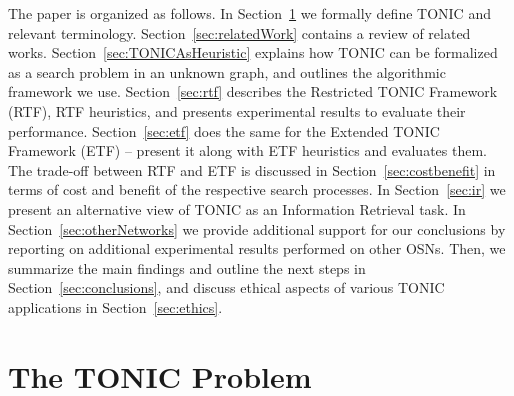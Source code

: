 \documentclass[journal]{IEEEtran}
\begin{document}


The paper is organized as follows. In Section~\ref{sec:problem} we formally define TONIC and relevant terminology. Section~\ref{sec:relatedWork} contains a review of related works. Section~\ref{sec:TONICAsHeuristic} explains how TONIC can be formalized as a search problem in an unknown graph, and outlines the algorithmic framework we use. Section~\ref{sec:rtf} describes the Restricted TONIC Framework (RTF), RTF heuristics, and presents experimental results to evaluate their performance. Section~\ref{sec:etf} does the same for the Extended TONIC Framework (ETF) -- present it along with ETF heuristics and evaluates them. The trade-off between RTF and ETF is discussed in Section~\ref{sec:costbenefit} in terms of cost and benefit of the respective search processes. In Section~\ref{sec:ir} we present an alternative view of TONIC as an Information Retrieval task. In Section~\ref{sec:otherNetworks} we provide additional support for our conclusions by reporting on additional experimental results performed on other OSNs. Then, we summarize the main findings and outline the next steps in Section~\ref{sec:conclusions}, and discuss ethical aspects of various TONIC applications in Section~\ref{sec:ethics}. 





\section{The TONIC Problem}
\label{sec:problem}
\end{document}
